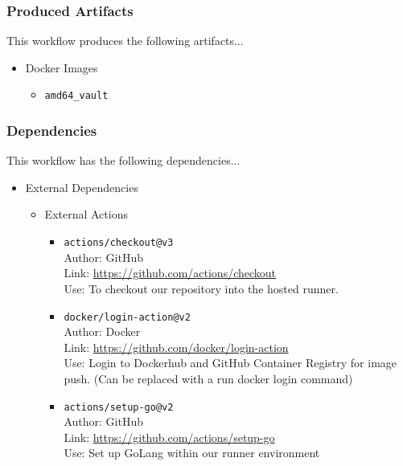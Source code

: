 \documentclass[a4paper,11pt]{article}
\begin{document}
\subsubsection{Produced Artifacts}
This workflow produces the following artifacts...
\begin{itemize}
    \item Docker Images
    \begin{itemize}
        \item\verb|amd64_vault|
    \end{itemize}
\end{itemize}

\subsubsection{Dependencies}
This workflow has the following dependencies...
\begin{itemize}
    \item External Dependencies
    \begin{itemize}
        \item External Actions
        \begin{itemize}
            \item\verb|actions/checkout@v3|\\Author: GitHub\\Link: \href{https://github.com/actions/checkout}{https://github.com/actions/checkout}\\Use: To checkout our repository into the hosted runner.
            \item\verb|docker/login-action@v2|\\Author: Docker\\Link: \href{https://github.com/docker/login-action}{https://github.com/docker/login-action}\\Use: Login to Dockerhub and GitHub Container Registry for image push. (Can be replaced with a run docker login command)
            \item\verb|actions/setup-go@v2|\\Author: GitHub\\Link: \href{https://github.com/actions/setup-go}{https://github.com/actions/setup-go}\\Use: Set up GoLang within our runner environment
        \end{itemize}
    \end{itemize}
\end{itemize}
\end{document}
